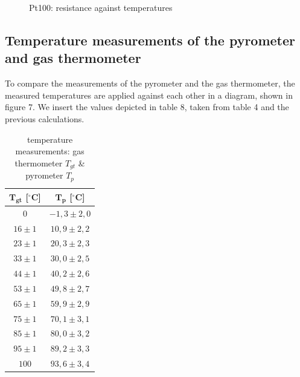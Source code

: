 \documentclass{article}
\begin{document}
\begin{figure} [!p]
    \centering
    \caption{Pt100: resistance against temperatures}
\end{figure}

\newpage

\subsection{Temperature measurements of the pyrometer and gas thermometer}

To compare the measurements of the pyrometer and the gas thermometer, the measured temperatures are applied against each other in a diagram, shown in figure 7. We insert the values depicted in table 8, taken from table 4 and the previous calculations. 

\begin{table}[!ht]
    \centering
    \begin{tabular}{c|c}
    $\bm{T_{gt}}$ [$^{\circ}$C] & $\bm{T_{p}}$ [$^{\circ}$C] \\ \hline
    $0$ & $-1,3 \pm 2,0$  \\
    $16 \pm 1$ & $10,9 \pm 2,2$  \\
    $23 \pm 1$ & $20,3 \pm 2,3$  \\
    $33 \pm 1$ & $30,0 \pm 2,5$  \\
    $44 \pm 1$ & $40,2 \pm 2,6$  \\
    $53 \pm 1$ & $49,8 \pm 2,7$  \\
    $65 \pm 1$ & $59,9 \pm 2,9$  \\
    $75 \pm 1$ & $70,1 \pm 3,1$  \\
    $85 \pm 1$ & $80,0 \pm 3,2$  \\
    $95 \pm 1$ & $89,2 \pm 3,3$  \\
    $100$ & $93,6 \pm 3,4$ 
    \end{tabular}
    \caption{temperature measurements: gas thermometer $T_{gt}$ \& pyrometer $T_{p}$}
\end{table}
\end{document}
